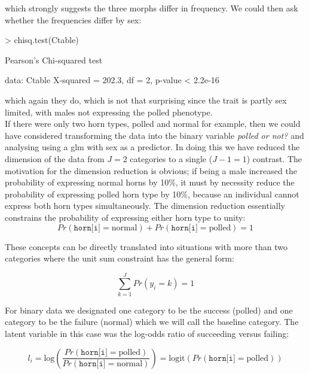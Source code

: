 \documentclass{article}
\begin{document}
which strongly suggests the three morphs differ in frequency. We could then ask whether the frequencies differ by sex:

\begin{Schunk}
\begin{Sinput}
> chisq.test(Ctable)
\end{Sinput}
\begin{Soutput}
	Pearson's Chi-squared test

data:  Ctable
X-squared = 202.3, df = 2, p-value < 2.2e-16
\end{Soutput}
\end{Schunk}

which again they do, which is not that surprising since the trait is partly sex limited, with males not expressing the polled phenotype.\\

If there were only two horn types, polled and normal for example, then we could have considered transforming the data into the binary variable \emph{polled or not?} and analysing using a glm with sex as a predictor. In doing this we have reduced the dimension of the data from $J=2$ categories to a single ($J-1=1$) contrast. The motivation for the dimension reduction is obvious; if being a male increased the probability of expressing normal horns by 10\%, it must by necessity reduce the probability of expressing polled horn type by 10\%, because an individual cannot express both horn types  simultaneously.  The dimension reduction essentially constrains the probability of expressing either horn type to unity:\\

\begin{equation}
Pr(\texttt{horn[i]}=\textrm{normal})+Pr(\texttt{horn[i]}=\textrm{polled}) = 1
\end{equation}

These concepts can be directly translated into situations with more than two categories where the unit sum constraint has the general form:

\begin{equation}
\sum_{k=1}^{J}Pr(y_{i}=k)=1 
\end{equation}

 For binary data we designated one category to be the success (polled) and one category to be the failure (normal) which we will call the baseline category.  The latent variable in this case was the log-odds ratio  of succeeding versus failing:

\begin{equation}
 l_{i} = \textrm{log}\left(\frac{Pr(\texttt{horn[i]}=\textrm{polled})}{Pr(\texttt{horn[i]}=\textrm{normal})}\right) = \textrm{logit}\left(Pr(\texttt{horn[i]}=\textrm{polled})\right)
\end{equation}
\end{document}
